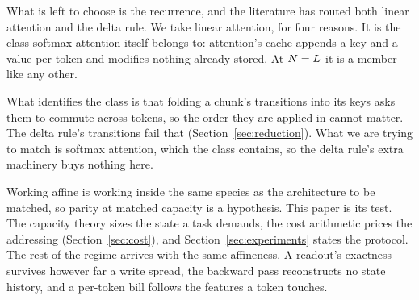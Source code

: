 What is left to choose is the recurrence, and the literature has routed both linear attention and the delta rule. We take linear attention, for four reasons. It is the class softmax attention itself belongs to: attention's cache appends a key and a value per token and modifies nothing already stored. At $N = L$ it is a member like any other.

What identifies the class is that folding a chunk's transitions into its keys asks them to commute across tokens, so the order they are applied in cannot matter. The delta rule's transitions fail that \citep{schlag2021fwp} (Section~\ref{sec:reduction}). What we are trying to match is softmax attention, which the class contains, so the delta rule's extra machinery buys nothing here.

Working affine is working inside the same species as the architecture to be matched, so parity at matched capacity is a hypothesis. This paper is its test. The capacity theory sizes the state a task demands, the cost arithmetic prices the addressing (Section~\ref{sec:cost}), and Section~\ref{sec:experiments} states the protocol. The rest of the regime arrives with the same affineness. A readout's exactness survives however far a write spread, the backward pass reconstructs no state history, and a per-token bill follows the features a token touches.

